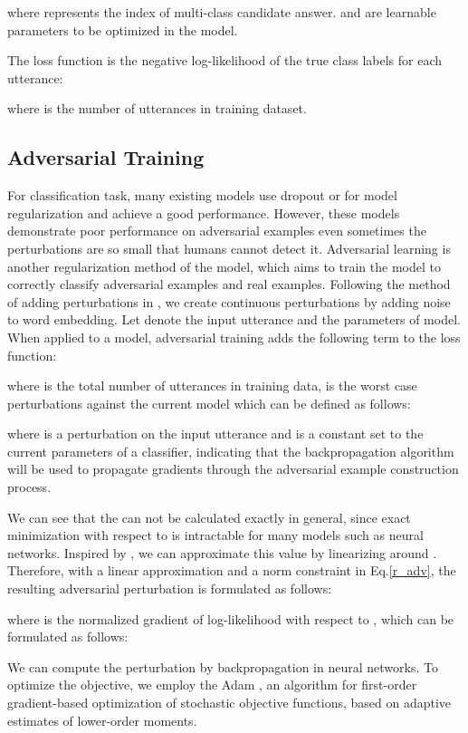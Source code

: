 \documentclass[conference]{IEEEtran}
\begin{document}
	
	where  represents the index of multi-class candidate answer.  and  are learnable parameters to be optimized in the model.
	
	The loss function is the negative log-likelihood of the true class labels  for each utterance:
	
	where  is the number of utterances in training dataset.
	\subsection{Adversarial Training} \label{adversarial}
	For classification task, many existing models use dropout or  for model regularization and achieve a good performance. However, these models demonstrate poor performance on adversarial examples even sometimes the perturbations are so small that humans cannot detect it. Adversarial learning is another regularization method of the model, which aims to train the model to correctly classify adversarial examples and real examples. Following the method of adding perturbations in \cite{miyato2016adversarial}, we create continuous perturbations by adding noise to word embedding. Let  denote the input utterance and  the parameters of model. When applied to a model, adversarial training adds the following term to the loss function:
	
	
	where  is the total number of utterances in training data,  is the worst case perturbations against the current model which can be defined as follows:
	
	where  is a perturbation on the input utterance  and  is a constant set to the current parameters of a classifier, indicating that the backpropagation algorithm will be used to propagate gradients through the adversarial example construction process.
	
	We can see that the  can not be calculated exactly in general, since exact minimization with respect to  is intractable for many models such as neural networks. Inspired by \cite{goodfellow2015explaining}, we can approximate this value by linearizing  around . Therefore, with a linear approximation and a  norm constraint in Eq.\ref{r_adv}, the resulting adversarial perturbation is formulated as follows:
	
	
	where  is the normalized gradient of log-likelihood with respect to , which can be formulated as follows:
	
	
We can compute the perturbation by backpropagation in neural networks.  
	To optimize the objective, we employ the Adam \cite{kingma2014adam}, an algorithm for first-order gradient-based optimization of stochastic objective functions, based on adaptive estimates of lower-order moments.
	
\end{document}
